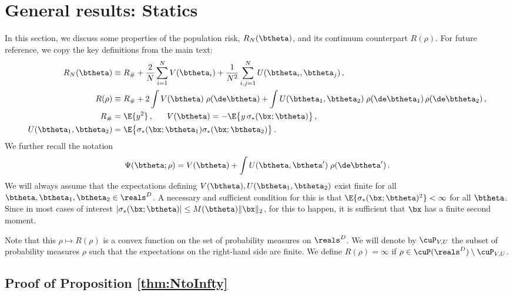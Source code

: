 \documentclass[11pt]{article}
\begin{document}
\section{General results: Statics}

In this section, we discuss some properties of the population risk, $R_N(\btheta)$, and its continuum counterpart $R(\rho)$. For future reference, we copy the key definitions from the main
text:
%
\begin{align}
%
R_N(\btheta) & \equiv R_{\#}+\frac{2}{N}\sum_{i=1}^NV(\btheta_i) +\frac{1}{N^2}\sum_{i,j=1}^N U(\btheta_i, \btheta_j)\, ,\\
R(\rho) & \equiv R_{\#}+2\int V(\btheta)\; \rho(\de\btheta) +\int U(\btheta_1, \btheta_2)\; \rho(\de\btheta_1)\, \rho(\de\btheta_2)\, ,\label{eq:R-Rho-def}\\
R_{\#} & = \E\{y^2\}\, ,\;\;\;\;\;\; V(\btheta) = - \E\big\{y\,\sigma_*(\bx;\btheta)\big\}\, ,\\
U(\btheta_1, \btheta_2) & = \E\big\{\sigma_*(\bx;\btheta_1) \sigma_*(\bx;\btheta_2)\big\}\, .
%
\end{align}
%
We further recall the notation
%
\begin{align}
%
\Psi(\btheta;\rho) = V(\btheta)+ \int U(\btheta, \btheta')\; \rho(\de\btheta')\, .
%
\end{align}
%
We will always assume that the expectations defining $V(\btheta), U(\btheta_1,\btheta_2)$ exist  finite for all $\btheta,\btheta_1,\btheta_2\in\reals^D$. A necessary and sufficient condition for this
is that $\E\{\sigma_*(\bx;\btheta)^2\}<\infty$ for all $\btheta$. Since in most cases of interest $|\sigma_*(\bx;\btheta)| \le M(\btheta)\|\bx\|_2$,
for this to happen, it is sufficient that $\bx$ has a finite second moment.

Note that this $\rho\mapsto R(\rho)$ is a convex function on the set of probability measures on $\reals^D$. We will denote by $\cuP_{V,U}$ the subset
of probability measures $\rho$ such  that the expectations on the right-hand side are finite. We define $R(\rho) = \infty$ if $\rho\in \cuP(\reals^D)\setminus\cuP_{V,U}$. 



\subsection{Proof of Proposition \ref{thm:NtoInfty}}
\label{sec:Proof NtoInfty}
\end{document}
